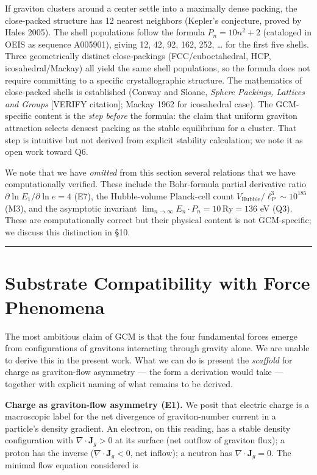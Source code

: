 \documentclass[12pt]{article}
\theoremstyle{definition}
\theoremstyle{remark}
\begin{document}
If graviton clusters around a center settle into a maximally dense
packing, the close-packed structure has 12 nearest neighbors (Kepler's
conjecture, proved by Hales 2005). The shell populations follow the
formula \(P_n = 10n^2 + 2\) (cataloged in OEIS as sequence A005901),
giving 12, 42, 92, 162, 252, \ldots{} for the first five shells. Three
geometrically distinct close-packings (FCC/cuboctahedral, HCP,
icosahedral/Mackay) all yield the same shell populations, so the formula
does not require committing to a specific crystallographic structure.
The mathematics of close-packed shells is established (Conway and
Sloane, \emph{Sphere Packings, Lattices and Groups} {[}VERIFY
citation{]}; Mackay 1962 for icosahedral case). The GCM-specific content
is the \emph{step before} the formula: the claim that uniform graviton
attraction selects densest packing as the stable equilibrium for a
cluster. That step is intuitive but not derived from explicit stability
calculation; we note it as open work toward Q6.

We note that we have \emph{omitted} from this section several relations
that we have computationally verified. These include the Bohr-formula
partial derivative ratio \(\partial \ln E_1 / \partial \ln e = 4\) (E7),
the Hubble-volume Planck-cell count
\(V_{\text{Hubble}}/\ell_P^3 \sim 10^{185}\) (M3), and the asymptotic
invariant \(\lim_{n\to\infty} E_n \cdot P_n = 10\,\text{Ry} = 136\) eV
(Q3). These are computationally correct but their physical content is
not GCM-specific; we discuss this distinction in §10.

\begin{center}\rule{0.5\linewidth}{0.5pt}\end{center}

\section{Substrate Compatibility with Force Phenomena}\label{sec:substrate}

The most ambitious claim of GCM is that the four fundamental forces
emerge from configurations of gravitons interacting through gravity
alone. We are unable to derive this in the present work. What we can do
is present the \emph{scaffold} for charge as graviton-flow asymmetry ---
the form a derivation would take --- together with explicit naming of
what remains to be derived.

\textbf{Charge as graviton-flow asymmetry (E1).} We posit that electric
charge is a macroscopic label for the net divergence of graviton-number
current in a particle's density gradient. An electron, on this reading,
has a stable density configuration with
\(\nabla \cdot \mathbf{J}_g > 0\) at its surface (net outflow of
graviton flux); a proton has the inverse
(\(\nabla \cdot \mathbf{J}_g < 0\), net inflow); a neutron has
\(\nabla \cdot \mathbf{J}_g = 0\). The minimal flow equation considered
is
\end{document}
